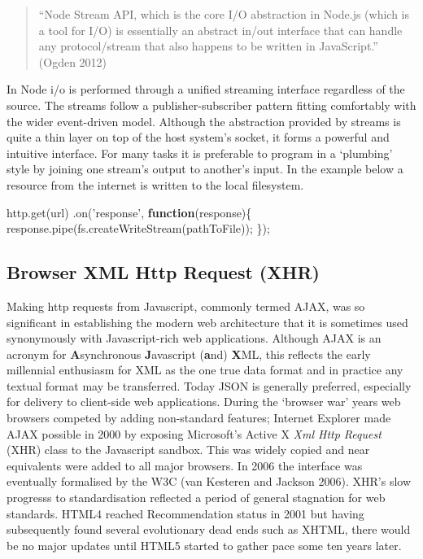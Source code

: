 \documentclass[]{article}
\newenvironment{Shaded}{}{}
\newcommand{\KeywordTok}[1]{\textcolor[rgb]{0.00,0.44,0.13}{\textbf{{#1}}}}
\newcommand{\StringTok}[1]{\textcolor[rgb]{0.25,0.44,0.63}{{#1}}}
\newcommand{\OtherTok}[1]{\textcolor[rgb]{0.00,0.44,0.13}{{#1}}}
\newcommand{\FunctionTok}[1]{\textcolor[rgb]{0.02,0.16,0.49}{{#1}}}
\newcommand{\NormalTok}[1]{{#1}}
\begin{document}
\begin{quote}
``Node Stream API, which is the core I/O abstraction in Node.js (which
is a tool for I/O) is essentially an abstract in/out interface that can
handle any protocol/stream that also happens to be written in
JavaScript.'' (Ogden 2012)
\end{quote}

In Node i/o is performed through a unified streaming interface
regardless of the source. The streams follow a publisher-subscriber
pattern fitting comfortably with the wider event-driven model. Although
the abstraction provided by streams is quite a thin layer on top of the
host system's socket, it forms a powerful and intuitive interface. For
many tasks it is preferable to program in a `plumbing' style by joining
one stream's output to another's input. In the example below a resource
from the internet is written to the local filesystem.

\begin{Shaded}
\begin{Highlighting}[]
\OtherTok{http}\NormalTok{.}\FunctionTok{get}\NormalTok{(url)}
   \NormalTok{.}\FunctionTok{on}\NormalTok{(}\StringTok{'response'}\NormalTok{, }\KeywordTok{function}\NormalTok{(response)\{}
      \OtherTok{response}\NormalTok{.}\FunctionTok{pipe}\NormalTok{(}\OtherTok{fs}\NormalTok{.}\FunctionTok{createWriteStream}\NormalTok{(pathToFile));}
   \NormalTok{\});}
\end{Highlighting}
\end{Shaded}

\subsection{Browser XML Http Request (XHR)}

Making http requests from Javascript, commonly termed AJAX, was so
significant in establishing the modern web architecture that it is
sometimes used synonymously with Javascript-rich web applications.
Although AJAX is an acronym for \textbf{A}synchronous
\textbf{J}avascript (\textbf{a}nd) \textbf{X}ML, this reflects the early
millennial enthusiasm for XML as the one true data format and in
practice any textual format may be transferred. Today JSON is generally
preferred, especially for delivery to client-side web applications.
During the `browser war' years web browsers competed by adding
non-standard features; Internet Explorer made AJAX possible in 2000 by
exposing Microsoft's Active X \emph{Xml Http Request} (XHR) class to the
Javascript sandbox. This was widely copied and near equivalents were
added to all major browsers. In 2006 the interface was eventually
formalised by the W3C (van Kesteren and Jackson 2006). XHR's slow
progresss to standardisation reflected a period of general stagnation
for web standards. HTML4 reached Recommendation status in 2001 but
having subsequently found several evolutionary dead ends such as XHTML,
there would be no major updates until HTML5 started to gather pace some
ten years later.
\end{document}
